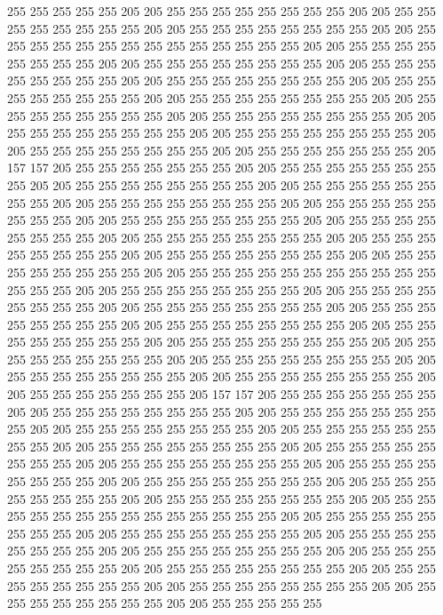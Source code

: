 255 255 255 255 255 205 205 255 255 255 255 255 255 255 255 205 205 255 255 255
255 255 255 255 255 205 205 255 255 255 255 255 255 255 255 205 205 255 255 255
255 255 255 255 255 255 255 255 255 255 255 205 205 255 255 255 255 255 255 255
255 205 205 255 255 255 255 255 255 255 255 205 205 255 255 255 255 255 255 255
255 205 205 255 255 255 255 255 255 255 255 205 205 255 255 255 255 255 255 255
255 205 205 255 255 255 255 255 255 255 255 205 205 255 255 255 255 255 255 255
255 205 205 255 255 255 255 255 255 255 255 205 205 255 255 255 255 255 255 255
255 205 205 255 255 255 255 255 255 255 255 205 205 255 255 255 255 255 255 255
255 205 205 255 255 255 255 255 255 255 205 157 157 205 255 255 255 255 255 255
255 205 205 255 255 255 255 255 255 255 255 205 205 255 255 255 255 255 255 255
255 205 205 255 255 255 255 255 255 255 255 205 205 255 255 255 255 255 255 255
255 205 205 255 255 255 255 255 255 255 255 205 205 255 255 255 255 255 255 255
255 205 205 255 255 255 255 255 255 255 255 205 205 255 255 255 255 255 255 255
255 205 205 255 255 255 255 255 255 255 255 205 205 255 255 255 255 255 255 255
255 205 205 255 255 255 255 255 255 255 255 205 205 255 255 255 255 255 255 255
255 255 255 255 255 255 255 205 205 255 255 255 255 255 255 255 255 205 205 255
255 255 255 255 255 255 255 205 205 255 255 255 255 255 255 255 255 205 205 255
255 255 255 255 255 255 255 205 205 255 255 255 255 255 255 255 255 205 205 255
255 255 255 255 255 255 255 205 205 255 255 255 255 255 255 255 255 205 205 255
255 255 255 255 255 255 255 205 205 255 255 255 255 255 255 255 255 205 205 255
255 255 255 255 255 255 255 205 205 255 255 255 255 255 255 255 255 205 205 255
255 255 255 255 255 255 205 157 157 205 255 255 255 255 255 255 255 205 205 255
255 255 255 255 255 255 255 205 205 255 255 255 255 255 255 255 255 205 205 255
255 255 255 255 255 255 255 205 205 255 255 255 255 255 255 255 255 205 205 255
255 255 255 255 255 255 255 205 205 255 255 255 255 255 255 255 255 205 205 255
255 255 255 255 255 255 255 205 205 255 255 255 255 255 255 255 255 205 205 255
255 255 255 255 255 255 255 205 205 255 255 255 255 255 255 255 255 205 205 255
255 255 255 255 255 255 255 205 205 255 255 255 255 255 255 255 255 255 255 255
255 255 255 205 205 255 255 255 255 255 255 255 255 205 205 255 255 255 255 255
255 255 255 205 205 255 255 255 255 255 255 255 255 205 205 255 255 255 255 255
255 255 255 205 205 255 255 255 255 255 255 255 255 205 205 255 255 255 255 255
255 255 255 205 205 255 255 255 255 255 255 255 255 205 205 255 255 255 255 255
255 255 255 205 205 255 255 255 255 255 255 255 255 205 205 255 255 255 255 255
